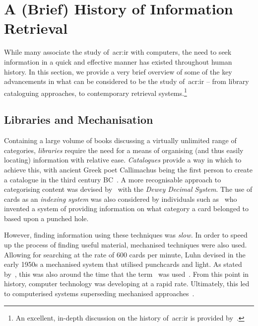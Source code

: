 \section{A (Brief) History of Information Retrieval}\label{sec:ir_background:history}
While many associate the study of~\gls{acr:ir} with computers, the need to seek information in a quick and effective manner has existed throughout human history. In this section, we provide a very brief overview of some of the key advancements in what can be considered to be the study of~\gls{acr:ir} -- from library cataloguing approaches, to contemporary retrieval systems.\footnote{An excellent, in-depth discussion on the history of~\gls{acr:ir} is provided by~\cite{sanderson2012history_of_ir}.}


\vspace*{-2mm}
\subsection{Libraries and Mechanisation}
\vspace*{-2mm}
Containing a large volume of books discussing a virtually unlimited range of categories, \emph{libraries} require the need for a means of organising (and thus easily locating) information with relative ease. \emph{Catalogues} provide a way in which to achieve this, with ancient Greek poet Callimachus being the first person to create a catalogue in the third century BC~\citep{eliot2009companion}. A more recognisable approach to categorising content was devised by~\cite{dewey1891dcs} with the \emph{Dewey Decimal System}. The use of cards as an \emph{indexing system} was also considered by individuals such as~\cite{soper1920patent} who invented a system of providing information on what category a card belonged to based upon a punched hole.

However, finding information using these techniques was \emph{slow.} In order to speed up the process of finding useful material, mechanised techniques were also used. Allowing for searching at the rate of $600$ cards per minute, Luhn devised in the early 1950s a mechanised system that utilised punchcards and light. As stated by~\cite{sanderson2012history_of_ir}, this was also around the time that the term~ was used~\citep{mooers1950theory}. From this point in history, computer technology was developing at a rapid rate. Ultimately, this led to computerised systems superseding mechanised approaches~\citep{jahoda1961electronic_searching}.

